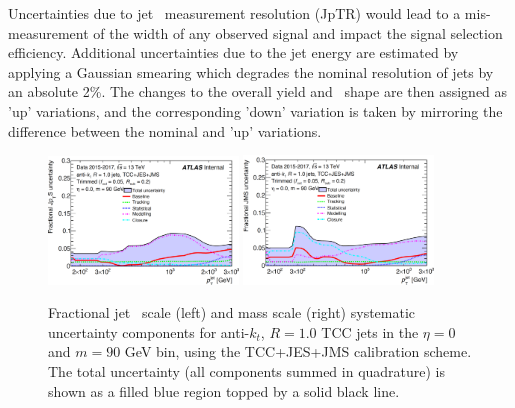 Uncertainties due to jet \pt\ measurement resolution (JpTR) would lead to a mis-measurement of the width of any observed signal and impact the signal selection efficiency.
Additional uncertainties due to the jet energy are estimated by applying a Gaussian smearing which degrades the nominal \pt resolution of jets by an absolute 2\%. %
The changes to the overall yield and \mvh\ shape are then assigned as  'up' variations, and the corresponding 'down' variation is taken by mirroring the difference between the nominal and 'up' variations.

\begin{figure}[htbp!]
\begin{center}
\includegraphics[width=0.45\textwidth]{JpTS_TCC_m90.png}
\includegraphics[width=0.45\textwidth]{JMS_TCC_m90.png}
\end{center}
\caption{Fractional jet \pt\ scale (left) and mass scale (right) systematic uncertainty components for anti-$k_t$, $R=1.0$ TCC jets in the $\eta = 0$ and $m = 90$ GeV bin, using the TCC+JES+JMS calibration scheme.
    The total uncertainty (all components summed in quadrature) is shown as a filled blue region topped by a solid black line.
}
\label{fig:tcc_rtrk}
\end{figure}

